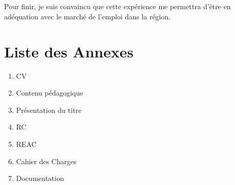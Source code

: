 \documentclass[11pt,a4paper]{report}
\begin{document}
	\paragraph*{}Pour finir, je suis convaincu que cette expérience me permettra d'être en adéquation avec le marché de l'emploi dans la région.
	


\chapter{Liste des Annexes}
	\begin{enumerate}
		\item CV
		\item Contenu pédagogique
		\item Présentation du titre
		\item RC
		\item REAC
		\item Cahier des Charges
		\item Documentation
	\end{enumerate}


\listoffigures
\end{document}

